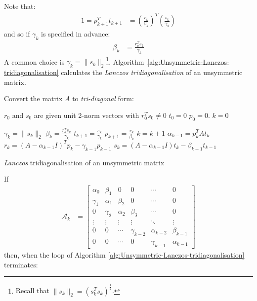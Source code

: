 \documentclass[a4paper,twoside,10pt,english]{report}
\begin{document}
Note that:
\begin{align}
1 = p_{k+1}^{T}t_{k+1}&=\left(\frac{r_{k}}{\beta_{k}}\right)^{T}
                      \left(\frac{s_{k}}{\gamma_{k}}\right)
\end{align}
and so if $\gamma_{k}$ is specified in advance:
\begin{align}
\beta_{k}&=\frac{r_{k}^{T}s_{k}}{\gamma_{k}}
\end{align}
A common choice is $\gamma_{k} = \|s_{k}\|_{2}$\footnote{Recall that 
$\|s_{k}\|_{2}=\left(s_{k}^{T}s_{k}\right)^{\frac{1}{2}}$.}.
Algorithm~\ref{alg:Unsymmetric-Lanczos-tridiagonalisation} calculates the
\emph{Lanczos tridiagonalisation} of an unsymmetric matrix.
\clearpage
\begin{algorithm}[!htbp]
Convert the matrix $A$ to \emph{tri-diagonal} form:
\begin{algorithmic}
\State $r_{0}$ and $s_{0}$ are given unit 2-norm vectors with $r_{0}^{T}s_{0} \ne 0$
\State $t_{0}=0$
\State $p_{0}=0$. 
\State $k=0$ 

\State $\gamma_{k} = \|s_{k}\|_{2}$
\State $\beta_{k} = \frac{r_{k}^{T}s_{k}}{\gamma_{k}}$
\State $t_{k+1} = \frac{s_{k}}{\gamma_{k}}$
\State $p_{k+1} = \frac{r_{k}}{\beta_{k}}$
\State $k = k+1$
\State $\alpha_{k-1} = p_{k}^{T}At_{k}$
\State $r_{k} = \left(A-\alpha_{k-1}I\right)^{T}p_{k}-\gamma_{k-1}p_{k-1}$
\State $s_{k} = \left(A-\alpha_{k-1}I\right)t_{k}-\beta_{k-1}t_{k-1}$
\EndWhile
\end{algorithmic}
\caption{\emph{Lanczos} tridiagonalisation of an unsymmetric matrix}
\label{alg:Unsymmetric-Lanczos-tridiagonalisation}
\end{algorithm}
If 
\begin{align*}
\mathcal{A}_{k} &= \left[\begin{array}{cccccc}
\alpha_{0} & \beta_{1} & 0 & 0 & \cdots & 0\\
\gamma_{1} & \alpha_{1} & \beta_{2} & 0 & \cdots & 0 \\
0 & \gamma_{2} & \alpha_{2} & \beta_{3} & \cdots & 0 \\
\vdots & \vdots & \vdots & \vdots & \ddots & \vdots \\
0 & 0 & \cdots & \gamma_{k-2} & \alpha_{k-2} & \beta_{k-1} \\
0 & 0 & \cdots & 0 & \gamma_{k-1} & \alpha_{k-1}
\end{array}\right] 
\end{align*}
then, when the loop of Algorithm 
\ref{alg:Unsymmetric-Lanczos-tridiagonalisation} terminates:
\end{document}
